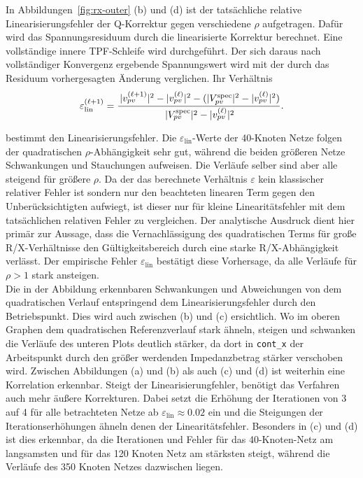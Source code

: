 In Abbildungen~\ref{fig:rx-outer} (b) und (d) ist der tatsächliche relative Linearisierungsfehler der Q-Korrektur gegen verschiedene $\rho$ aufgetragen.
Dafür wird das Spannungsresiduum durch die linearisierte Korrektur berechnet.
Eine vollständige innere TPF-Schleife wird durchgeführt.
Der sich daraus nach vollst\"andiger Konvergenz ergebende Spannungswert wird mit der durch das Residuum vorhergesagten \"Anderung verglichen.
Ihr Verh\"altnis
\begin{equation}
	\varepsilon_{\mathrm{lin}}^{(\ell+1)}
	=
	\frac{\,\lvert v_{pv}^{(\ell+1)}\rvert^2 - \lvert v_{pv}^{(\ell)}\rvert^2
		- (\lvert V_{pv}^{\mathrm{spec}}\rvert^2 - \lvert v_{pv}^{(\ell)}\rvert^2)}
	{\,\lvert V_{pv}^{\mathrm{spec}}\rvert^2 - \lvert v_{pv}^{(\ell)}\rvert^2}.
	\label{eq:sens_error_code}
\end{equation}

bestimmt den Linearisierungsfehler.
Die $\varepsilon_\mathrm{lin}$-Werte der 40-Knoten Netze folgen der quadratischen $\rho$-Abhängigkeit sehr gut, während die beiden größeren Netze Schwankungen und Stauchungen aufweisen.
Die Verläufe selber sind aber alle steigend für größere $\rho$.
Da der das berechnete Verhältnis $\varepsilon$ kein klassischer relativer Fehler ist sondern nur den beachteten linearen Term gegen den Unberücksichtigten aufwiegt, ist dieser nur für kleine Linearitätsfehler mit dem tatsächlichen relativen Fehler zu vergleichen.
Der analytische Ausdruck dient hier primär zur Aussage, dass die Vernachlässigung des quadratischen Terms für große R/X-Verhältnisse den Gültigkeitsbereich durch eine starke R/X-Abhängigkeit verlässt. 
Der empirische Fehler $\varepsilon_{\mathrm{lin}}$ bestätigt diese Vorhersage, da alle Verläufe für $\rho>1$ stark ansteigen.\\

Die in der Abbildung erkennbaren Schwankungen und Abweichungen von dem quadratischen Verlauf entspringend dem Linearisierungsfehler durch den Betriebspunkt.
Dies wird auch zwischen (b) und (c) ersichtlich. 
Wo im oberen Graphen dem quadratischen Referenzverlauf stark ähneln, steigen und schwanken die Verläufe des unteren Plots deutlich stärker, da dort in \texttt{cont\_x} der Arbeitspunkt durch den größer werdenden Impedanzbetrag stärker verschoben wird.
Zwischen Abbildungen (a) und (b) als auch (c) und (d) ist weiterhin eine Korrelation erkennbar. 
Steigt der Linearisierungfehler, benötigt das Verfahren auch mehr äußere Korrekturen.
Dabei setzt die Erhöhung der Iterationen von 3 auf 4 für alle betrachteten Netze ab $\varepsilon_{\mathrm{lin}}\approx0.02$ ein und die Steigungen der Iterationserhöhungen ähneln denen der Linearitätsfehler. 
Besonders in (c) und (d) ist dies erkennbar, da die Iterationen und Fehler für das 40-Knoten-Netz am langsamsten und für das 120 Knoten Netz am stärksten steigt, während die Verläufe des 350 Knoten Netzes dazwischen liegen.\\



